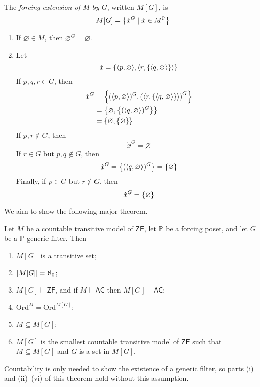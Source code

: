 \begin{definition}
    The \emph{forcing extension of \( M \) by \( G \)}, written \( M[G] \), is
    \[ M[G] = \qty{\dot x^G \mid \dot x \in M^{\mathbb P}} \]
\end{definition}
\begin{example}
    \begin{enumerate}
        \item If \( \varnothing \in M \), then \( \varnothing^G = \varnothing \).
        \item Let
        \[ \dot x = \qty{\langle p, \varnothing \rangle, \langle r, \qty{\langle q, \varnothing \rangle} \rangle} \]
        If \( p, q, r \in G \), then
        \begin{align*}
            \dot x^G &= \qty{(\langle p, \varnothing \rangle)^G, \qty(\langle r, \qty{\langle q, \varnothing \rangle} \rangle)^G} \\
            &= \qty{\varnothing, \qty{(\langle q, \varnothing \rangle)^G}} \\
            &= \qty{\varnothing, \qty{\varnothing}}
        \end{align*}
        If \( p, r \notin G \), then
        \[ \dot x^G = \varnothing \]
        If \( r \in G \) but \( p, q \notin G \), then
        \[ \dot x^G = \qty{(\langle q, \varnothing \rangle)^G} = \qty{\varnothing} \]
        Finally, if \( p \in G \) but \( r \notin G \), then
        \[ \dot x^G = \qty{\varnothing} \]
    \end{enumerate}
\end{example}
We aim to show the following major theorem.
\begin{theorem}
    Let \( M \) be a countable transitive model of \( \mathsf{ZF} \), let \( \mathbb P \) be a forcing poset, and let \( G \) be a \( \mathbb P \)-generic filter.
    Then
    \begin{enumerate}
        \item \( M[G] \) is a transitive set;
        \item \( \abs{M[G]} = \aleph_0 \);
        \item \( M[G] \vDash \mathsf{ZF} \), and if \( M \vDash \mathsf{AC} \) then \( M[G] \vDash \mathsf{AC} \);
        \item \( \mathrm{Ord}^M = \mathrm{Ord}^{M[G]} \);
        \item \( M \subseteq M[G] \);
        \item \( M[G] \) is the smallest countable transitive model of \( \mathsf{ZF} \) such that \( M \subseteq M[G] \) and \( G \) is a set in \( M[G] \).
    \end{enumerate}
\end{theorem}
Countability is only needed to show the existence of a generic filter, so parts (i) and (ii)--(vi) of this theorem hold without this assumption.

